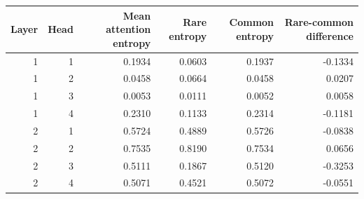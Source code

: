 \begin{tabular}{rrrrrr}
\toprule
Layer & Head & Mean attention entropy & Rare entropy & Common entropy & Rare-common difference \\
\midrule
1 & 1 & 0.1934 & 0.0603 & 0.1937 & -0.1334 \\
1 & 2 & 0.0458 & 0.0664 & 0.0458 & 0.0207 \\
1 & 3 & 0.0053 & 0.0111 & 0.0052 & 0.0058 \\
1 & 4 & 0.2310 & 0.1133 & 0.2314 & -0.1181 \\
2 & 1 & 0.5724 & 0.4889 & 0.5726 & -0.0838 \\
2 & 2 & 0.7535 & 0.8190 & 0.7534 & 0.0656 \\
2 & 3 & 0.5111 & 0.1867 & 0.5120 & -0.3253 \\
2 & 4 & 0.5071 & 0.4521 & 0.5072 & -0.0551 \\
\bottomrule
\end{tabular}
